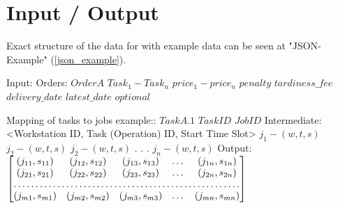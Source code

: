 \documentclass[a4paper,12pt,twoside]{scrreprt}
\begin{document}
\section{Input / Output}
Exact structure of the data for with example data can be seen at "JSON-Example" (\autoref{json_example}).
\begin{flushleft}
	Input:\linebreak
	Orders:\linebreak
	$Order A$\linebreak
	$Task_1 - Task_n$\linebreak
	$price_1 - price_n$\linebreak
	$penalty$\linebreak
	$tardiness\_fee$\linebreak
	$delivery\_date$\linebreak
	$latest\_date$\linebreak
	$optional$\linebreak
	
	Mapping of tasks to jobs example::\linebreak
	$Task A.1$\linebreak
	$Task ID$\linebreak
	$Job ID$ \linebreak\linebreak
	Intermediate:\linebreak
	<Workstation ID, Task (Operation) ID, Start Time Slot>
	$j_1 - (w, t, s)$\linebreak
	$j_2 - (w, t, s)$\linebreak
	$j_2 - (w, t, s)$\linebreak
	.\linebreak
	.\linebreak
	.\linebreak
	$j_n - (w, t, s)$\linebreak\linebreak
	Output:\linebreak
	$
	\begin{bmatrix}
		(j_{11}, s_{11}) & (j_{12}, s_{12}) & (j_{13}, s_{13}) & \dots & (j_{1n}, s_{1n})\\
		(j_{21}, s_{21}) & (j_{22}, s_{22}) & (j_{23}, s_{23}) & \dots & (j_{2n}, s_{2n})\\
		\hdotsfor{5} \\
		(j_{m1}, s_{m1}) & (j_{m2}, s_{m2}) & (j_{m3}, s_{m3}) & \dots & (j_{mn}, s_{mn})\\
	\end{bmatrix}
	$
	

\end{flushleft}
\end{document}
